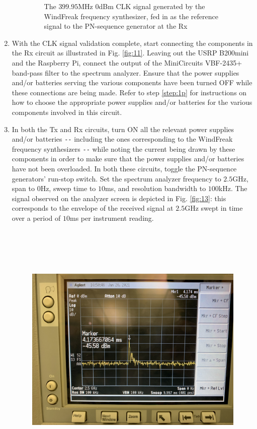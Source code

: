 \documentclass[12pt, draftcls, onecolumn]{IEEEtran}
\begin{document}
\begin{enumerate}
\begin{itemize}
\begin{figure}
        \caption{The $399.95$MHz $0$dBm CLK signal generated by the WindFreak frequency synthesizer, fed in as the reference signal to the PN-sequence generator at the Rx}
        \label{fig:12}
    \end{figure}
    \end{itemize}
    \item With the CLK signal validation complete, start connecting the components in the Rx circuit as illustrated in Fig. \ref{fig:11}. Leaving out the USRP B200mini and the Raspberry Pi, connect the output of the MiniCircuits VBF-2435+ band-pass filter to the spectrum analyzer. Ensure that the power supplies and/or batteries serving the various components have been turned OFF while these connections are being made. Refer to step \ref{step:1p} for instructions on how to choose the appropriate power supplies and/or batteries for the various components involved in this circuit.
    \item In both the Tx and Rx circuits, turn ON all the relevant power supplies and/or batteries \texttt{-{}-} including the ones corresponding to the WindFreak frequency synthesizers \texttt{-{}-} while noting the current being drawn by these components in order to make sure that the power supplies and/or batteries have not been overloaded. In both these circuits, toggle the PN-sequence generators' run-stop switch. Set the spectrum analyzer frequency to $2.5$GHz, span to $0$Hz, sweep time to $10$ms, and resolution bandwidth to $100$kHz. The signal observed on the analyzer screen is depicted in Fig. \ref{fig:13}: this corresponds to the envelope of the received signal at $2.5$GHz swept in time over a period of $10$ms per instrument reading.
    \begin{figure}
        \centering
        \includegraphics[width=15cm, height=12.5cm]{16.jpg}

\end{figure}
\end{enumerate}
\end{document}
